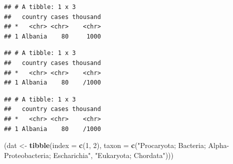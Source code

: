 \documentclass[]{book}
\newenvironment{Shaded}{\begin{snugshade}}{\end{snugshade}}
\newcommand{\KeywordTok}[1]{\textcolor[rgb]{0.13,0.29,0.53}{\textbf{#1}}}
\newcommand{\DataTypeTok}[1]{\textcolor[rgb]{0.13,0.29,0.53}{#1}}
\newcommand{\DecValTok}[1]{\textcolor[rgb]{0.00,0.00,0.81}{#1}}
\newcommand{\StringTok}[1]{\textcolor[rgb]{0.31,0.60,0.02}{#1}}
\newcommand{\OperatorTok}[1]{\textcolor[rgb]{0.81,0.36,0.00}{\textbf{#1}}}
\newcommand{\NormalTok}[1]{#1}
\begin{document}
\begin{Shaded}
\end{Shaded}

\begin{verbatim}
## # A tibble: 1 x 3
##   country cases thousand
## *   <chr> <chr>    <chr>
## 1 Albania    80     1000
\end{verbatim}

\begin{Shaded}
\end{Shaded}

\begin{verbatim}
## # A tibble: 1 x 3
##   country cases thousand
## *   <chr> <chr>    <chr>
## 1 Albania    80    /1000
\end{verbatim}

\begin{Shaded}
\end{Shaded}

\begin{verbatim}
## # A tibble: 1 x 3
##   country cases thousand
## *   <chr> <chr>    <chr>
## 1 Albania    80    /1000
\end{verbatim}

\begin{Shaded}
\begin{Highlighting}[]
\NormalTok{(dat <-}\StringTok{ }\KeywordTok{tibble}\NormalTok{(}\DataTypeTok{index =} \KeywordTok{c}\NormalTok{(}\DecValTok{1}\NormalTok{, }\DecValTok{2}\NormalTok{), }
               \DataTypeTok{taxon =} \KeywordTok{c}\NormalTok{(}\StringTok{"Procaryota; Bacteria; Alpha-Proteobacteria; Escharichia"}\NormalTok{, }\StringTok{"Eukaryota; Chordata"}\NormalTok{)))}
\end{Highlighting}
\end{Shaded}
\end{document}
